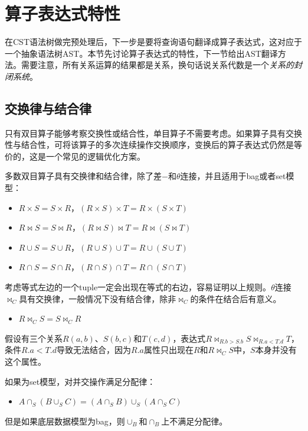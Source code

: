 \section{算子表达式特性}

在CST语法树做完预处理后，下一步是要将查询语句翻译成算子表达式，这对应于一个抽象语法树AST。本节先讨论算子表达式的特性，下一节给出AST翻译方法。需要注意，所有关系运算的结果都是关系，换句话说关系代数是一个\emph{关系的封闭系统}。

\subsection{交换律与结合律}

只有双目算子能够考察交换性或结合性，单目算子不需要考虑。如果算子具有交换性与结合性，可将该算子的多次连续操作交换顺序，变换后的算子表达式仍然是等价的，这是一个常见的逻辑优化方案。

多数双目算子具有交换律和结合律，除了差$-$和$\theta$连接，并且适用于bag或者set模型：

\begin{itemize}
    \item $R \times S = S \times R$，$(R\times S) \times T = R\times (S\times T)$
    \item $R \bowtie S = S \bowtie R$，$(R \bowtie S) \bowtie T = R \bowtie (S \bowtie T)$
    \item $R \cup S = S \cup R$，$(R \cup S) \cup T = R \cup (S \cup T)$
    \item $R \cap S = S \cap R$，$(R \cap S) \cap T = R \cap (S \cap T)$
\end{itemize}

考虑等式左边的一个tuple一定会出现在等式的右边，容易证明以上规则。$\theta$连接$\bowtie_C$具有交换律，一般情况下没有结合律，除非$\bowtie_C$的条件在结合后有意义。
\begin{itemize}
    \item $R \bowtie_C S = S \bowtie_C R$
\end{itemize}

\begin{example}
    假设有三个关系$R(a,b)$、$S(b,c)$和$T(c,d)$，表达式$R \bowtie_{R.b>S.b} S \bowtie_{R.a<T.d} T$，条件$R.a<T.d$导致无法结合，因为$R.a$属性只出现在$R$和$R \bowtie_C S$中，$S$本身并没有这个属性。
\end{example}

如果为set模型，对并交操作满足分配律：
\begin{itemize}
    \item $A \cap_S (B \cup_S C) = (A \cap_S B) \cup_S (A \cap_S C)$
\end{itemize}
但是如果底层数据模型为bag，则$\cup_B$和$\cap_B$上不满足分配律。

